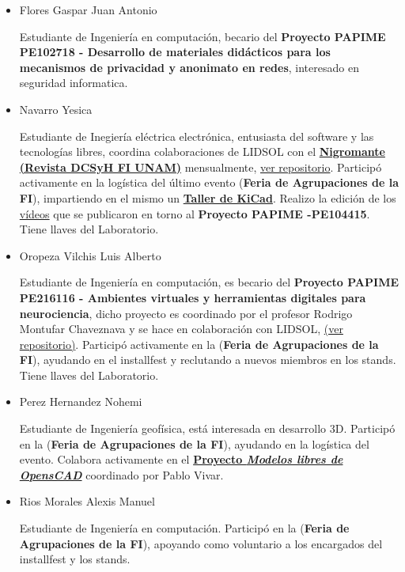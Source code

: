 \documentclass[a4paper,11pt]{article}                 %
\begin{document}
\begin{itemize}
    \item Flores Gaspar Juan Antonio
    
    Estudiante de Ingeniería en computación, becario del \textbf{Proyecto PAPIME PE102718 - Desarrollo de materiales didácticos para los mecanismos de privacidad y anonimato en redes}, interesado en seguridad informatica. 
    

    \item Navarro Yesica 
    
    Estudiante de Inegiería eléctrica electrónica, entusiasta del software y las tecnologías libres, coordina colaboraciones de LIDSOL con el \href{https://issuu.com/nigromantefi}{\textbf{Nigromante  (Revista DCSyH FI  UNAM)}} mensualmente, \href{https://github.com/LIDSOL/material-didactico/tree/master/nigromante}{ver repositorio}. Participó activamente en la logística del último evento (\textbf{Feria de Agrupaciones de la FI}),  impartiendo en el mismo un \href{https://github.com/yesn7/taller-kicad/}{\textbf{Taller de KiCad}}. Realizo la edición de los \href{https://www.youtube.com/channel/UCwHFqMqxUcCAJSdek3e4zOw}{vídeos} que se publicaron en torno al  \textbf{Proyecto PAPIME -PE104415}. Tiene llaves del Laboratorio.
    
    \item Oropeza Vilchis Luis Alberto
    
    Estudiante de Ingeniería en computación, es becario del \textbf{Proyecto PAPIME PE216116 - Ambientes virtuales y herramientas digitales para neurociencia}, dicho proyecto es coordinado por el profesor Rodrigo Montufar Chaveznava y se hace en colaboración con LIDSOL, \href{https://github.com/LIDSOL/portia}{(ver repositorio)}. Participó activamente en la (\textbf{Feria de Agrupaciones de la FI}), ayudando en el installfest y reclutando a nuevos miembros en los stands. Tiene llaves del Laboratorio.
    
    \item Perez Hernandez Nohemi
    
    Estudiante de Ingeniería geofísica, está interesada en desarrollo 3D. Participó en la (\textbf{Feria de Agrupaciones de la FI}), ayudando en la logística del evento. Colabora activamente en el \href{https://github.com/LIDSOL/OpenSCAD-free-models}{\textbf{Proyecto \textit{Modelos libres de OpensCAD}}} coordinado por Pablo Vivar.
    
    \item Rios Morales Alexis Manuel
    
    Estudiante de Ingeniería en computación. Participó en la (\textbf{Feria de Agrupaciones de la FI}), apoyando como voluntario a los encargados del installfest y  los stands.
     

\end{itemize}
\end{document}
